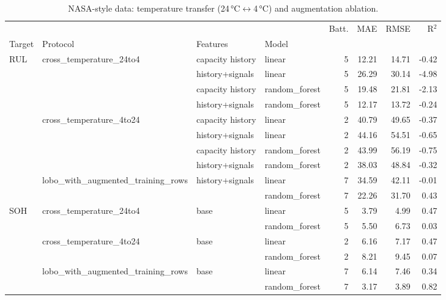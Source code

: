 \begin{table}[htbp]\centering\footnotesize
\begin{tabular}{llllrrrr}
\toprule
 &  &  &  & Batt. & MAE & RMSE & R$^2$ \\
Target & Protocol & Features & Model &  &  &  &  \\
\midrule
\multirow[t]{10}{*}{RUL} & \multirow[t]{4}{*}{cross\_temperature\_24to4} & capacity history & linear & 5 & 12.21 & 14.71 & -0.42 \\
\cline{3-8}
 &  & history+signals & linear & 5 & 26.29 & 30.14 & -4.98 \\
\cline{3-8}
 &  & capacity history & random\_forest & 5 & 19.48 & 21.81 & -2.13 \\
\cline{3-8}
 &  & history+signals & random\_forest & 5 & 12.17 & 13.72 & -0.24 \\
\cline{2-8} \cline{3-8}
 & \multirow[t]{4}{*}{cross\_temperature\_4to24} & capacity history & linear & 2 & 40.79 & 49.65 & -0.37 \\
\cline{3-8}
 &  & history+signals & linear & 2 & 44.16 & 54.51 & -0.65 \\
\cline{3-8}
 &  & capacity history & random\_forest & 2 & 43.99 & 56.19 & -0.75 \\
\cline{3-8}
 &  & history+signals & random\_forest & 2 & 38.03 & 48.84 & -0.32 \\
\cline{2-8} \cline{3-8}
 & \multirow[t]{2}{*}{lobo\_with\_augmented\_training\_rows} & \multirow[t]{2}{*}{history+signals} & linear & 7 & 34.59 & 42.11 & -0.01 \\
 &  &  & random\_forest & 7 & 22.26 & 31.70 & 0.43 \\
\cline{1-8} \cline{2-8} \cline{3-8}
\multirow[t]{6}{*}{SOH} & \multirow[t]{2}{*}{cross\_temperature\_24to4} & \multirow[t]{2}{*}{base} & linear & 5 & 3.79 & 4.99 & 0.47 \\
 &  &  & random\_forest & 5 & 5.50 & 6.73 & 0.03 \\
\cline{2-8} \cline{3-8}
 & \multirow[t]{2}{*}{cross\_temperature\_4to24} & \multirow[t]{2}{*}{base} & linear & 2 & 6.16 & 7.17 & 0.47 \\
 &  &  & random\_forest & 2 & 8.21 & 9.45 & 0.07 \\
\cline{2-8} \cline{3-8}
 & \multirow[t]{2}{*}{lobo\_with\_augmented\_training\_rows} & \multirow[t]{2}{*}{base} & linear & 7 & 6.14 & 7.46 & 0.34 \\
 &  &  & random\_forest & 7 & 3.17 & 3.89 & 0.82 \\
\cline{1-8} \cline{2-8} \cline{3-8}
\bottomrule
\end{tabular}
\caption{NASA-style data: temperature transfer (24\,°C$\leftrightarrow$4\,°C) and augmentation ablation.}\label{tab:agingtransfer}
\end{table}
